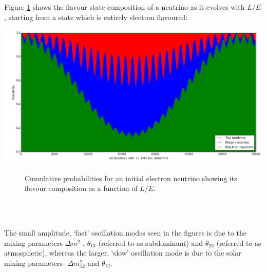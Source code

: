 \documentclass[12pt]{article}
\begin{document}
Figure \ref{fig:cumulative} shows the flavour state composition of a neutrino as it evolves with $L/E$, starting from a state which is entirely electron flavoured:
\begin{center}
\includegraphics[scale=0.4]{mixing_demo.png}
\begin{figure}[h!]
\caption{Cumulative probabilities for an initial electron neutrino showing its flavour composition as a function of $L/E$.}
\label{fig:cumulative}
\end{figure}\\\\
\end{center}
The small amplitude, `fast' oscillation modes seen in the figures is due to the mixing parameters $\Delta m^2$ , $\theta_{13}$ (referred to as subdominant) and $\theta_{23}$ (referred to as atmospheric), whereas the larger, `slow' oscillation mode is due to the solar mixing parameters- $\Delta m_{12}^2$ and $\theta_{12}$.
\end{document}
